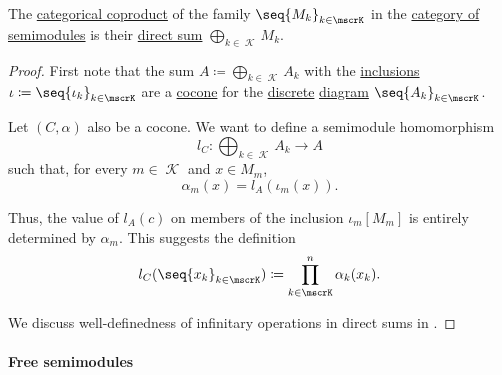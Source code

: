 \begin{proposition}\label{thm:semimodule_coproduct}
  The \hyperref[def:discrete_category_limits]{categorical coproduct} of the family \( \seq{ M_k }_{k \in \mscrK} \) in the \hyperref[def:semimodule/category]{category of  semimodules} is their \hyperref[def:first_order_direct_product]{direct sum} \( \bigoplus_{k \in \mscrK} M_k \).
\end{proposition}
\begin{proof}
  First note that the sum \( A \coloneqq \bigoplus_{k \in \mscrK} A_k \) with the \hyperref[def:semimodule_direct_sum/inclusion]{inclusions} \( \iota \coloneqq \seq{ \iota_k }_{k \in \mscrK} \) are a \hyperref[def:category_of_cones/cocone]{cocone} for the \hyperref[def:discrete_category]{discrete} \hyperref[def:categorical_diagram]{diagram} \( \seq{ A_k }_{k \in \mscrK} \).

  Let \( (C, \alpha) \) also be a cocone. We want to define a semimodule homomorphism
  \begin{equation*}
    l_C: \bigoplus_{k \in \mscrK} A_k \to A
  \end{equation*}
  such that, for every \( m \in \mscrK \) and \( x \in M_m \),
  \begin{equation*}
    \alpha_m(x) = l_A(\iota_m(x)).
  \end{equation*}

  Thus, the value of \( l_A(c) \) on members of the inclusion \( \iota_m[M_m] \) is entirely determined by \( \alpha_m \). This suggests the definition
  \begin{equation*}
    l_C(\seq{ x_k }_{k \in \mscrK}) \coloneqq \prod_{k \in \mscrK}^n \alpha_k(x_k).
  \end{equation*}

  We discuss well-definedness of infinitary operations in direct sums in .
\end{proof}

\paragraph{Free semimodules}

